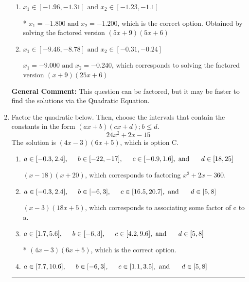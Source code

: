 \documentclass{extbook}[14pt]
\newcommand{\litem}[1]{\item #1

\rule{\textwidth}{0.4pt}}
\begin{document}
\begin{enumerate}
{\begin{enumerate}[label=\Alph*.]
$x_1 = -3.600 \text{ and } x_2 = -0.600$, which corresponds to solving the factored version $(5x + 18)(5x + 3)$
\item \( x_1 \in [-1.96, -1.31] \text{ and } x_2 \in [-1.23, -1.1] \)

* $x_1 = -1.800 \text{ and } x_2 = -1.200$, which is the correct option. Obtained by solving the factored version $(5x + 9)(5x + 6)$
\item \( x_1 \in [-9.46, -8.78] \text{ and } x_2 \in [-0.31, -0.24] \)

$x_1 = -9.000 \text{ and } x_2 = -0.240$, which corresponds to solving the factored version $(x + 9)(25x + 6)$
\end{enumerate}

\textbf{General Comment:} This question can be factored, but it may be faster to find the solutions via the Quadratic Equation.
}
\litem{
Factor the quadratic below. Then, choose the intervals that contain the constants in the form $(ax+b)(cx+d); b \leq d.$
\[ 24x^{2} +2 x -15 \]The solution is \( (4x -3)(6x + 5) \), which is option C.\begin{enumerate}[label=\Alph*.]
\item \( a \in [-0.3, 2.4], \hspace*{5mm} b \in [-22, -17], \hspace*{5mm} c \in [-0.9, 1.6], \text{ and } \hspace*{5mm} d \in [18, 25] \)

 $(x -18)(x + 20)$, which corresponds to factoring $x^{2} +2 x -360$.
\item \( a \in [-0.3, 2.4], \hspace*{5mm} b \in [-6, 3], \hspace*{5mm} c \in [16.5, 20.7], \text{ and } \hspace*{5mm} d \in [5, 8] \)

 $(x -3)(18x + 5)$, which corresponds to associating some factor of c to a.
\item \( a \in [1.7, 5.6], \hspace*{5mm} b \in [-6, 3], \hspace*{5mm} c \in [4.2, 9.6], \text{ and } \hspace*{5mm} d \in [5, 8] \)

* $(4x -3)(6x + 5)$, which is the correct option.
\item \( a \in [7.7, 10.6], \hspace*{5mm} b \in [-6, 3], \hspace*{5mm} c \in [1.1, 3.5], \text{ and } \hspace*{5mm} d \in [5, 8] \)


\end{enumerate}}
\end{enumerate}
\end{document}
